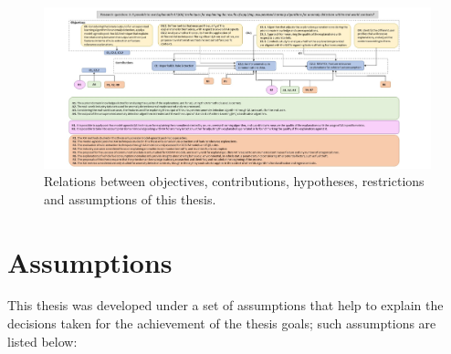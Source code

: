 

\begin{figure}
  \centering
  \includegraphics[width=0.85\columnwidth]{figures/EvaluationPlan.jpg}
  \caption{Relations between objectives, contributions, hypotheses, restrictions and assumptions of this thesis.}
  \label{fig:EvaluationPlan}
\end{figure}

\section{Assumptions}\label{sec:Assumptions}
This thesis was developed under a set of assumptions that help to explain the decisions taken for the achievement of the thesis goals; such assumptions are listed below:

